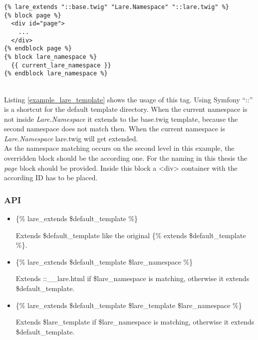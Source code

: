 \begin{minipage}[c]{0.95\linewidth}
\begin{lstlisting}[caption=Example Lare Template, label=example_lare_template]
{% lare_extends "::base.twig" "Lare.Namespace" "::lare.twig" %}
{% block page %}
  <div id="page">
    ...
  </div>
{% endblock page %}
{% block lare_namespace %}
  {{ current_lare_namespace }}
{% endblock lare_namespace %}
\end{lstlisting}
\end{minipage}
\\
Listing \ref{example_lare_template} shows the usage of this tag.
Using Symfony \enquote{::} is a shortcut for the default template directory.
When the current namespace is not inside \emph{Lare.Namespace} it extends to the base.twig template, because the second namespace does not match then.
When the current namespace is \emph{Lare.Namespace} lare.twig will get extended.
\\
As the namespace matching occurs on the second level in this example, the overridden block should be the according one.
For the naming in this thesis the \emph{page} block should be provided.
Inside this block a <div> container with the according ID has to be placed.

\subsubsection{API}

\begin{itemize}
\item \{\% lare\_extends \$default\_template \%\}

Extends \$default\_template like the original \{\% extends \$default\_template \%\}.
\item \{\% lare\_extends \$default\_template \$lare\_namespace \%\}

Extends ::\_\_lare.html if \$lare\_namespace is matching, otherwise it extends \$default\_template.
\item \{\% lare\_extends \$default\_template \$lare\_template \$lare\_namespace \%\}

Extends \$lare\_template if \$lare\_namespace is matching, otherwise it extends \$default\_template.
\end{itemize}


\subsection{\djangoLare{}}

